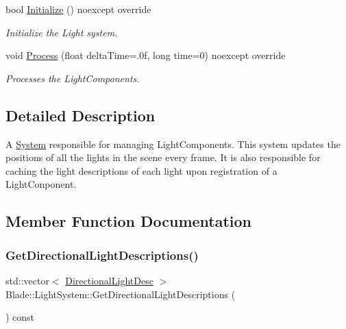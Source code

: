 \begin{DoxyCompactItemize}
bool \hyperlink{class_blade_1_1_light_system_af87b68ecd946b49576a17e59bfc88934}{Initialize} () noexcept override
\begin{DoxyCompactList}\small\item\em Initialize the Light system. \end{DoxyCompactList}\item 
void \hyperlink{class_blade_1_1_light_system_afbad47302dca40e57322a68252cb08e7}{Process} (float delta\+Time=.\+0f, long time=0) noexcept override
\begin{DoxyCompactList}\small\item\em Processes the Light\+Components. \end{DoxyCompactList}\end{DoxyCompactItemize}


\subsection{Detailed Description}
A \hyperlink{class_blade_1_1_system}{System} responsible for managing Light\+Components. This system updates the positions of all the lights in the scene every frame. It is also responsible for caching the light descriptions of each light upon registration of a Light\+Conponent. 

\subsection{Member Function Documentation}
\mbox{\label{class_blade_1_1_light_system_a9efaf399620fc75c86fd6032b9291651}} 
\subsubsection{\texorpdfstring{Get\+Directional\+Light\+Descriptions()}{GetDirectionalLightDescriptions()}}
{\footnotesize\ttfamily std\+::vector$<$ \hyperlink{struct_blade_1_1_directional_light_desc}{Directional\+Light\+Desc} $>$ Blade\+::\+Light\+System\+::\+Get\+Directional\+Light\+Descriptions (\begin{DoxyParamCaption}{ }\end{DoxyParamCaption}) const\hspace{0.3cm}{\ttfamily [noexcept]}}




